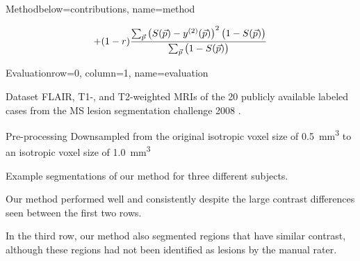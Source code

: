 \documentclass[%
portrait,paperwidth=841mm,paperheight=1180mm,%
margin=2cm,
fontscale=0.32
]{baposter}
\newcommand{\vect}[1]{\vec{#1}}
\begin{document}
\begin{poster}
\begin{headerblock}{Method}{below=contributions, name=method}
\begin{compactitem}
\begin{equation}
+(1-r)\frac{\textstyle\sum_{\vect{p}} \left(S(\vect{p}) -
y^{(2)}(\vect{p})\right)^2 \big(1 - S(\vect{p})\big)}{%
\textstyle\sum_{\vect{p}}\big(1 - S(\vect{p})\big)}
\end{equation}
\end{compactitem}
\end{headerblock}


\begin{headerblock}{Evaluation}{row=0, column=1, name=evaluation}

\begin{compactdesc}
\item[Dataset] FLAIR, T1-, and T2-weighted MRIs of the
20 publicly available labeled cases from the MS lesion segmentation challenge
2008 \cite{styner20083d}.
\item[Pre-processing] Downsampled from the original isotropic voxel
size of \SI{0.5}{\cubic\milli\metre} to an isotropic voxel size of
\SI{1.0}{\cubic\milli\metre}
\end{compactdesc}
\begin{compactitem}
\item Example segmentations of our method for three different subjects.
\item Our method performed well and consistently despite the
large contrast differences seen between the first two rows.
\item In the third row, our method also segmented regions that have similar
contrast, although these regions had not been identified as lesions by the
manual rater.
\end{compactitem}

\def\MRIwidth{0.13\textwidth}
\begin{center}
\end{center}
\end{headerblock}
\end{poster}
\end{document}
